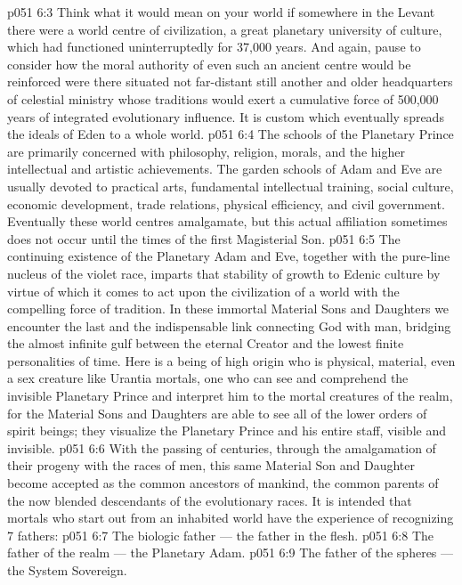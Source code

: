 \vs p051 6:3 Think what it would mean on your world if somewhere in the Levant there were a world centre of civilization, a great planetary university of culture, which had functioned uninterruptedly for 37,000 years. And again, pause to consider how the moral authority of even such an ancient centre would be reinforced were there situated not far\hyp{}distant still another and older headquarters of celestial ministry whose traditions would exert a cumulative force of 500,000 years of integrated evolutionary influence. It is custom which eventually spreads the ideals of Eden to a whole world.
\vs p051 6:4 The schools of the Planetary Prince are primarily concerned with philosophy, religion, morals, and the higher intellectual and artistic achievements. The garden schools of Adam and Eve are usually devoted to practical arts, fundamental intellectual training, social culture, economic development, trade relations, physical efficiency, and civil government. Eventually these world centres amalgamate, but this actual affiliation sometimes does not occur until the times of the first Magisterial Son.
\vs p051 6:5 \pc The continuing existence of the Planetary Adam and Eve, together with the pure\hyp{}line nucleus of the violet race, imparts that stability of growth to Edenic culture by virtue of which it comes to act upon the civilization of a world with the compelling force of tradition. In these immortal Material Sons and Daughters we encounter the last and the indispensable link connecting God with man, bridging the almost infinite gulf between the eternal Creator and the lowest finite personalities of time. Here is a being of high origin who is physical, material, even a sex creature like Urantia mortals, one who can see and comprehend the invisible Planetary Prince and interpret him to the mortal creatures of the realm, for the Material Sons and Daughters are able to see all of the lower orders of spirit beings; they visualize the Planetary Prince and his entire staff, visible and invisible.
\vs p051 6:6 With the passing of centuries, through the amalgamation of their progeny with the races of men, this same Material Son and Daughter become accepted as the common ancestors of mankind, the common parents of the now blended descendants of the evolutionary races. It is intended that mortals who start out from an inhabited world have the experience of recognizing 7 fathers:
\vs p051 6:7 \bibnobreakspace The biologic father --- the father in the flesh.
\vs p051 6:8 \bibnobreakspace The father of the realm --- the Planetary Adam.
\vs p051 6:9 \bibnobreakspace The father of the spheres --- the System Sovereign.
